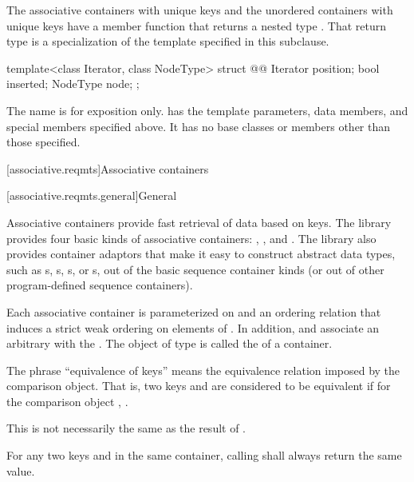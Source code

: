 \pnum
The associative containers with unique keys and the unordered containers with unique keys
have a member function  that returns a nested type .
That return type is a specialization of the template specified in this subclause.

\begin{codeblock}
template<class Iterator, class NodeType>
struct @@ {
  Iterator position;
  bool     inserted;
  NodeType node;
};
\end{codeblock}

\pnum
The name  is for exposition only.
 has the template parameters,
data members, and special members specified above.
It has no base classes or members other than those specified.

[associative.reqmts]{Associative containers}

[associative.reqmts.general]{General}

\pnum
Associative containers provide fast retrieval of data based on keys.
The library provides four basic kinds of associative containers:
,
,
and
.
The library also provides container adaptors
that make it easy to construct abstract data types,
such as s, s,
s, or s,
out of the basic sequence container kinds
(or out of other program-defined sequence containers).

\pnum
Each associative container is parameterized on
and an ordering relation
that induces a strict weak ordering on
elements of
.
In addition,
and
associate an arbitrary 
with the
.
The object of type
is called the
of a container.

\pnum
The phrase ``equivalence of keys'' means the equivalence relation imposed by the
comparison object.
That is, two keys
and
are considered to be equivalent if for the
comparison object
,
.
\begin{note}
This is not necessarily the same as the result of .
\end{note}
For any two keys
and
in the same container, calling
shall always return the same value.

